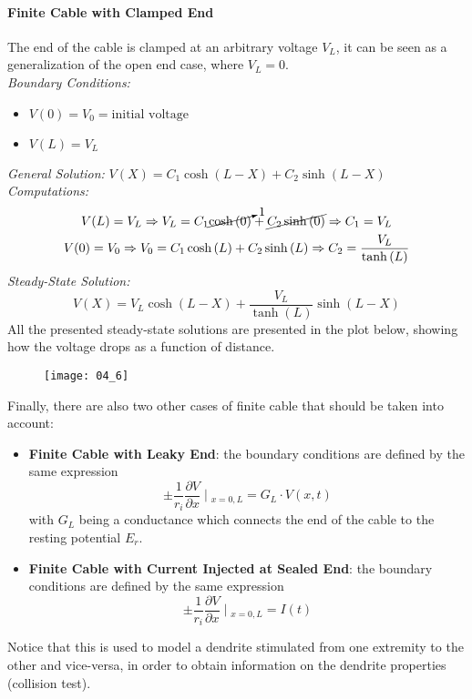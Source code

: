 \paragraph{Finite Cable with Clamped End} The end of the cable is clamped
at an arbitrary voltage \(V_{L}\), it can be seen as a generalization of
the open end case, where \(V_{L}=0\).\\
\textit{Boundary Conditions:}
\begin{itemize}
    \item \(V(0)=V_{0}=\text{initial voltage}\)
    \item \(V(L)=V_{L}\)
\end{itemize}
\textit{General Solution:} \(V(X)=C_{1}\cosh{(L-X)}+C_{2}\sinh{(L-X)}\)\\
\textit{Computations:}
\begin{gather*}
    V(L)=V_{L}
    \Rightarrow{V_{L}=C_{1}\cancelto{1}{\cosh{(0)}}+\cancel{C_{2}\sinh{(0)}}}
    \Rightarrow{C_{1}=V_{L}}\\
    V(0)=V_{0}
    \Rightarrow{V_{0}=C_{1}\cosh{(L)}+C_{2}\sinh{(L)}}
    \Rightarrow{C_{2}=\frac{V_{L}}{\tanh{(L)}}}
\end{gather*}
\textit{Steady-State Solution:}
\begin{equation*}
    V(X)=V_{L}\cosh{(L-X)}+\frac{V_{L}}{\tanh{(L)}}\sinh{(L-X)}
\end{equation*}
All the presented steady-state solutions are presented in the plot below, showing
how the voltage drops as a function of distance.
\begin{figure}[H]
    \texttt{[image: 04\_6]}
    \centering
\end{figure}
Finally, there are also two other cases of finite cable that should be taken into
account:
\begin{itemize}
    \item \textbf{Finite Cable with Leaky End}: the boundary conditions are defined
    by the same expression
    \begin{equation*}
        \pm{\frac{1}{r_{i}}\frac{\partial{V}}{\partial{x}}}\mid{}_{x=0,L}=G_{L}\cdot{V(x,t)}
    \end{equation*}
    with \(G_{L}\) being a conductance which connects the end of the cable to the resting
    potential \(E_{r}\).
    \item \textbf{Finite Cable with Current Injected at Sealed End}: the boundary conditions
    are defined by the same expression
    \begin{equation*}
        \pm{\frac{1}{r_{i}}\frac{\partial{V}}{\partial{x}}}\mid{}_{x=0,L}=I(t)
    \end{equation*}
\end{itemize}
Notice that this is used to model a dendrite stimulated from one extremity to the other
and vice-versa, in order to obtain information on the dendrite properties (collision test).
